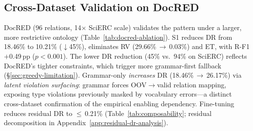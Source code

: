 
\subsection{Cross-Dataset Validation on DocRED}
\label{sec:docred-results}

DocRED (96 relations, 14$\times$ SciERC scale) validates the pattern under a larger, more restrictive ontology (Table~\ref{tab:docred-ablation}).
S1 reduces DR from 18.46\% to 10.21\% ($\downarrow$45\%), eliminates RV (29.66\%\,$\to$\,0.03\%) and ET, with R-F1 $+$0.49\,pp ($p < 0.001$).
The lower DR reduction (45\% vs.\ 94\% on SciERC) reflects DocRED's tighter constraints, which trigger more grammar-first fallback (\S\ref{sec:greedy-limitation}).
Grammar-only \emph{increases} DR (18.46\%\,$\to$\,26.17\%) via \textit{latent violation surfacing}: grammar forces OOV$\to$valid relation mapping, exposing type violations previously masked by vocabulary errors---a distinct cross-dataset confirmation of the empirical enabling dependency.
Fine-tuning reduces residual DR to $\leq$\,0.21\% (Table~\ref{tab:composability}; residual decomposition in Appendix~\ref{app:residual-dr-analysis}).
